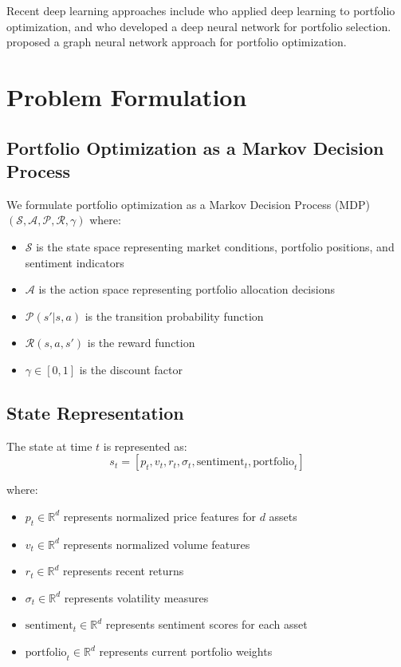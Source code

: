 \documentclass[11pt,twocolumn]{article}
\newcommand{\R}{\mathbb{R}}
\theoremstyle{definition}
\begin{document}
Recent deep learning approaches include \citet{heaton2017deep} who applied deep learning to portfolio optimization, and \citet{liu2018deep} who developed a deep neural network for portfolio selection. \citet{chen2020deep} proposed a graph neural network approach for portfolio optimization.

\section{Problem Formulation}

\subsection{Portfolio Optimization as a Markov Decision Process}

We formulate portfolio optimization as a Markov Decision Process (MDP) $(\mathcal{S}, \mathcal{A}, \mathcal{P}, \mathcal{R}, \gamma)$ where:

\begin{itemize}
\item $\mathcal{S}$ is the state space representing market conditions, portfolio positions, and sentiment indicators
\item $\mathcal{A}$ is the action space representing portfolio allocation decisions
\item $\mathcal{P}(s'|s,a)$ is the transition probability function
\item $\mathcal{R}(s,a,s')$ is the reward function
\item $\gamma \in [0,1]$ is the discount factor
\end{itemize}

\subsection{State Representation}

The state at time $t$ is represented as:
\begin{equation}
s_t = [p_t, v_t, r_t, \sigma_t, \text{sentiment}_t, \text{portfolio}_t]
\end{equation}

where:
\begin{itemize}
\item $p_t \in \R^d$ represents normalized price features for $d$ assets
\item $v_t \in \R^d$ represents normalized volume features
\item $r_t \in \R^d$ represents recent returns
\item $\sigma_t \in \R^d$ represents volatility measures
\item $\text{sentiment}_t \in \R^d$ represents sentiment scores for each asset
\item $\text{portfolio}_t \in \R^d$ represents current portfolio weights
\end{itemize}
\end{document}

